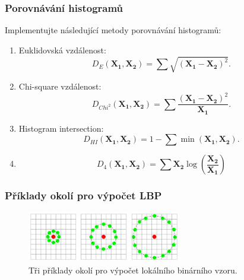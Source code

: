 \documentclass[12pt, a4paper]{article}
\begin{document}
\newpage


\subsubsection*{Porovnávání histogramů}
\par{Implementujte následující metody porovnávání histogramů:
\begin{enumerate}
	\item Euklidovská vzdálenost: 
		\begin{equation}
			D_E(\bm{X_1}, \bm{X_2}) = \sum \sqrt{\left( \bm{X_1} - \bm{X_2} \right)^{2}}.
		\end{equation}
	\item Chi-square vzdálenost:
		\begin{equation}
			D_{Chi^2}(\bm{X_1}, \bm{X_2}) = \sum \frac{\left( \bm{X_1} - \bm{X_2} \right)^{2}}{\bm{X_1}}.
		\end{equation}
	\item Histogram intersection:
		\begin{equation}
			D_{HI}(\bm{X_1}, \bm{X_2}) = 1 - \sum \min \left( \bm{X_1}, \bm{X_2} \right).
		\end{equation}
	\item 
		\begin{equation}
			D_{4}(\bm{X_1}, \bm{X_2}) = \sum \bm{X_2} \log \left( \frac{\bm{X_2}}{\bm{X_1}} \right)
		\end{equation}
\end{enumerate}}





\subsubsection*{Příklady okolí pro výpočet LBP}
\begin{figure}[!ht]
	\centering
	\includegraphics[width = 0.6\textwidth]{./Lbp_neighbors.jpg}
	\caption{Tři příklady okolí pro výpočet lokálního binárního vzoru.}
\end{figure}
\end{document}
